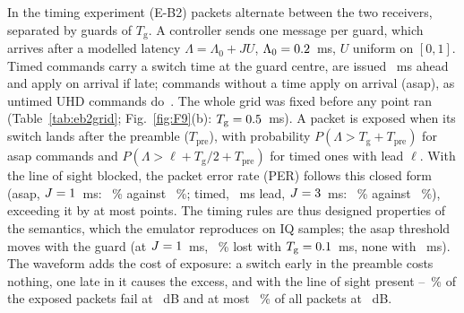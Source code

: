 \begin{figure}[t]
\centering
{}
\end{figure}

In the timing experiment (E-B2) \numEbPackets{} packets alternate between
the two receivers, separated by guards of $T_{\mathrm{g}}$. A controller sends one message per
guard, which arrives after a modelled latency $\Lambda=\Lambda_0+JU$, $\Lambda_0=0.2$~ms,
$U$ uniform on $[0,1]$. Timed commands carry a switch time at the guard centre, are issued
\numEbLeadsMs~ms ahead and apply on arrival if late; commands without a time apply on arrival
(asap), as untimed UHD commands do~\cite{UHDManual}. The whole grid was fixed before any point
ran (Table~\ref{tab:eb2grid}; Fig.~\ref{fig:F9}(b): $T_{\mathrm{g}}=0.5$~ms).
A packet is exposed when its switch lands after the preamble
($T_{\mathrm{pre}}$), with probability $P(\Lambda>T_{\mathrm{g}}+T_{\mathrm{pre}})$ for asap
commands and $P(\Lambda>\ell+T_{\mathrm{g}}/2+T_{\mathrm{pre}})$ for timed ones with lead $\ell$.
With the line of sight blocked, the packet error rate (PER) follows this closed form (asap,
$J=1$~ms: \numEbCfAsapOneMeasPct~\% against \numEbCfAsapOnePct~\%; timed,
\numEbLeadMidMs~ms lead, $J=3$~ms: \numEbCfTimedThreeMeasPct~\% against
\numEbCfTimedThreePct~\%), exceeding it by at most \numEbCfMaxExcessPts{} points. The timing
rules are thus designed properties of the semantics, which the emulator reproduces on IQ
samples; the asap threshold moves with the guard (at $J=1$~ms,
\numEbAsapShortGuardPct~\% lost with $T_{\mathrm{g}}=0.1$~ms, none with
\numEbGuardLongMs~ms). The waveform adds the cost of exposure: a switch early in the preamble
costs nothing, one late in it causes the excess, and with the line of sight present
\numEbLosLoExposedMinPct--\numEbLosLoExposedMaxPct~\% of the exposed packets fail at
\numEbArcEsnoLowDb~dB and at most \numEbLosHiPerMaxPct~\% of all packets at \numEbEsnoDb~dB.

